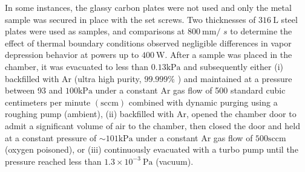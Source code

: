 \documentclass[10pt]{article}
\begin{document}
In some instances, the glassy carbon plates were not used and only the metal sample was secured in place with the set screws. Two thicknesses of $316 \mathrm{~L}$ steel plates were used as samples, and comparisons at $800 \mathrm{~mm} /$ $s$ to determine the effect of thermal boundary conditions observed negligible differences in vapor depression behavior at powers up to $400 \mathrm{~W}$. After a sample was placed in the chamber, it was evacuated to less than $0.13 \mathrm{kPa}$ and subsequently either (i) backfilled with Ar (ultra high purity, $99.999 \%$ ) and maintained at a pressure between 93 and $100 \mathrm{kPa}$ under a constant Ar gas flow of 500 standard cubic centimeters per minute $(\mathrm{sccm})$ combined with dynamic purging using a roughing pump (ambient), (ii) backfilled with Ar, opened the chamber door to admit a significant volume of air to the chamber, then closed the door and held at a constant pressure of $\sim 101 \mathrm{kPa}$ under a constant Ar gas flow of $500 \mathrm{sccm}$ (oxygen poisoned), or (iii) continuously evacuated with a turbo pump until the pressure reached less than $1.3 \times 10^{-3} \mathrm{~Pa}$ (vacuum).
\end{document}
